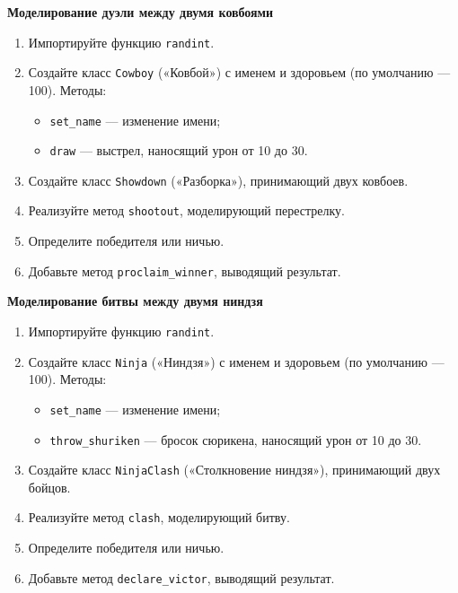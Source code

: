 \item \textbf{Моделирование дуэли между двумя ковбоями}

\begin{enumerate}
    \item Импортируйте функцию \texttt{randint}.

    \item Создайте класс \texttt{Cowboy} («Ковбой») с именем и здоровьем (по умолчанию — 100).  
    Методы:
    \begin{itemize}
        \item \texttt{set\_name} — изменение имени;
        \item \texttt{draw} — выстрел, наносящий урон от 10 до 30.
    \end{itemize}

    \item Создайте класс \texttt{Showdown} («Разборка»), принимающий двух ковбоев.

    \item Реализуйте метод \texttt{shootout}, моделирующий перестрелку.

    \item Определите победителя или ничью.

    \item Добавьте метод \texttt{proclaim\_winner}, выводящий результат.
\end{enumerate}

\item \textbf{Моделирование битвы между двумя ниндзя}

\begin{enumerate}
    \item Импортируйте функцию \texttt{randint}.

    \item Создайте класс \texttt{Ninja} («Ниндзя») с именем и здоровьем (по умолчанию — 100).  
    Методы:
    \begin{itemize}
        \item \texttt{set\_name} — изменение имени;
        \item \texttt{throw\_shuriken} — бросок сюрикена, наносящий урон от 10 до 30.
    \end{itemize}

    \item Создайте класс \texttt{NinjaClash} («Столкновение ниндзя»), принимающий двух бойцов.

    \item Реализуйте метод \texttt{clash}, моделирующий битву.

    \item Определите победителя или ничью.

    \item Добавьте метод \texttt{declare\_victor}, выводящий результат.
\end{enumerate}

